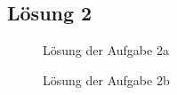 \documentclass[main.tex]{subfiles}
\begin{document}
\subsection{Lösung 2}
\begin{figure}[h]
    \caption{Lösung der Aufgabe 2a}
    \label{fig:lgs2a}
\end{figure}

\begin{figure}[h]
    \caption{Lösung der Aufgabe 2b}
    \label{fig:lgs2b}
\end{figure}
\end{document}
